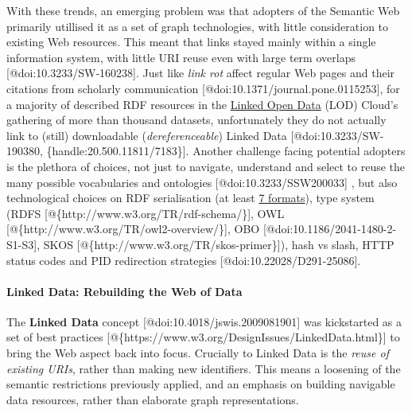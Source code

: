 With these trends, an emerging problem was that adopters of the Semantic
Web primarily utillised it as a set of graph technologies, with little
consideration to existing Web resources. This meant that links stayed
mainly within a single information system, with little URI reuse even
with large term overlaps {[}@doi:10.3233/SW-160238{]}. Just like
\emph{link rot} affect regular Web pages and their citations from
scholarly communication {[}@doi:10.1371/journal.pone.0115253{]}, for a
majority of described RDF resources in the
\href{https://lod-cloud.net/}{Linked Open Data} (LOD) Cloud's gathering
of more than thousand datasets, unfortunately they do not actually link
to (still) downloadable (\emph{dereferenceable}) Linked Data
{[}@doi:10.3233/SW-190380, \{handle:20.500.11811/7183\}{]}. Another
challenge facing potential adopters is the plethora of choices, not just
to navigate, understand and select to reuse the many possible
vocabularies and ontologies {[}@doi:10.3233/SSW200033{]} , but also
technological choices on RDF serialisation (at least
\href{https://www.w3.org/TR/rdf11-primer/\#section-graph-syntax}{7
formats}), type system (RDFS
{[}@\{http://www.w3.org/TR/rdf-schema/\}{]}, OWL
{[}@\{http://www.w3.org/TR/owl2-overview/\}{]}, OBO
{[}@doi:10.1186/2041-1480-2-S1-S3{]}, SKOS
{[}@\{http://www.w3.org/TR/skos-primer\}{]}), hash vs slash, HTTP status
codes and PID redirection strategies {[}@doi:10.22028/D291-25086{]}.

\hypertarget{sec:ld-web}{%
\paragraph{Linked Data: Rebuilding the Web of Data}\label{sec:ld-web}}

The \textbf{Linked Data} concept {[}@doi:10.4018/jswis.2009081901{]} was
kickstarted as a set of best practices
{[}@\{https://www.w3.org/DesignIssues/LinkedData.html\}{]} to bring the
Web aspect back into focus. Crucially to Linked Data is the \emph{reuse
of existing URIs}, rather than making new identifiers. This means a
loosening of the semantic restrictions previously applied, and an
emphasis on building navigable data resources, rather than elaborate
graph representations.

